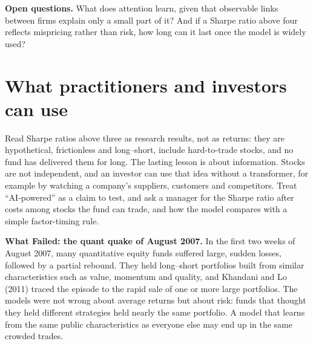 \label{sec:22-open}
\textbf{Open questions.} What does attention learn, given that observable links between firms explain only a small part of it? And if a Sharpe ratio above four reflects mispricing rather than risk, how long can it last once the model is widely used?

\section{What practitioners and investors can use}
\label{sec:22-investors}

Read Sharpe ratios above three as research results, not as returns: they are hypothetical, frictionless and long--short, include hard-to-trade stocks, and no fund has delivered them for long. The lasting lesson is about information. Stocks are not independent, and an investor can use that idea without a transformer, for example by watching a company's suppliers, customers and competitors. Treat ``AI-powered'' as a claim to test, and ask a manager for the Sharpe ratio after costs among stocks the fund can trade, and how the model compares with a simple factor-timing rule.

\begin{callout}
\textbf{What Failed: the quant quake of August 2007.} In the first two weeks of August 2007, many quantitative equity funds suffered large, sudden losses, followed by a partial rebound. They held long--short portfolios built from similar characteristics such as value, momentum and quality, and Khandani and Lo (2011) traced the episode to the rapid sale of one or more large portfolios. The models were not wrong about average returns but about risk: funds that thought they held different strategies held nearly the same portfolio. A model that learns from the same public characteristics as everyone else may end up in the same crowded trades.
\end{callout}

\makeatletter
{}
\makeatother

